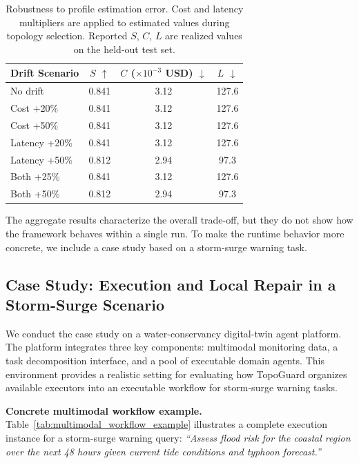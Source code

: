 \documentclass[manuscript,review,anonymous]{acmart}
\begin{document}
\begin{table}[t]
\centering
\caption{Robustness to profile estimation error. Cost and latency multipliers are applied to estimated values during topology selection. Reported $S$, $C$, $L$ are realized values on the held-out test set.}
\label{tab:drift_results}
\small
\begin{tabular}{lccc}
\toprule
\textbf{Drift Scenario} & \textbf{$S$ $\uparrow$} & \textbf{$C$ ($\times 10^{-3}$ USD) $\downarrow$} & \textbf{$L$ $\downarrow$} \\
\midrule
No drift         & 0.841 & 3.12 & 127.6 \\
Cost +20\%       & 0.841 & 3.12 & 127.6 \\
Cost +50\%       & 0.841 & 3.12 & 127.6 \\
Latency +20\%    & 0.841 & 3.12 & 127.6 \\
Latency +50\%    & 0.812 & 2.94 & 97.3  \\
Both +25\%       & 0.841 & 3.12 & 127.6 \\
Both +50\%       & 0.812 & 2.94 & 97.3  \\
\bottomrule
\end{tabular}
\end{table}

The aggregate results characterize the overall trade-off, but they do not show how the framework behaves within a single run. To make the runtime behavior more concrete, we include a case study based on a storm-surge warning task.

\subsection{Case Study: Execution and Local Repair in a Storm-Surge Scenario}

We conduct the case study on a water-conservancy digital-twin agent platform. The platform integrates three key components: multimodal monitoring data, a task decomposition interface, and a pool of executable domain agents. This environment provides a realistic setting for evaluating how TopoGuard organizes available executors into an executable workflow for storm-surge warning tasks.

\medskip
\noindent\textbf{Concrete multimodal workflow example.}
Table~\ref{tab:multimodal_workflow_example} illustrates a complete execution instance for a storm-surge warning query: \emph{``Assess flood risk for the coastal region over the next 48 hours given current tide conditions and typhoon forecast.''}
\end{document}
